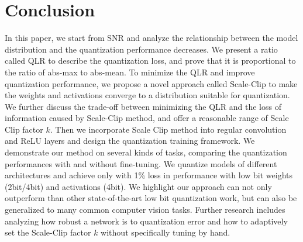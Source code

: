 \documentclass[letterpaper]{article} %
\begin{document}



\section{Conclusion}
In this paper, we start from SNR and analyze the relationship between the model distribution and the quantization performance decreases. We present a ratio called QLR to describe the quantization loss, and prove that it is proportional to the ratio of abs-max to abs-mean. To minimize the QLR and improve quantization performance, we propose a novel approach called Scale-Clip to make the weights and activations converge to a distribution suitable for quantization. We further discuss the trade-off between minimizing the QLR and the loss of information caused by Scale-Clip method, and offer a reasonable range of Scale Clip factor $k$. Then we incorporate Scale Clip method into regular convolution and ReLU layers and design the quantization training framework. We demonstrate our method on several kinds of tasks, comparing the quantization performances with and without fine-tuning. We quantize models of different architectures and achieve only with 1\% loss in performance with low bit weights (2bit/4bit) and activations (4bit). We highlight our approach can not only outperform than other state-of-the-art low bit quantization work, but can also be generalized to many common computer vision tasks. Further research includes analyzing how robust a network is to quantization error and how to adaptively set the Scale-Clip factor $k$ without specifically tuning by hand.
\end{document}

